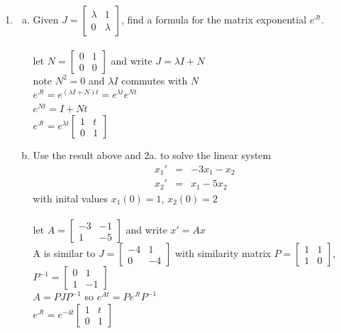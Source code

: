 \documentclass{article}
\begin{document}
{{\begin{enumerate}
\newpage\item \begin{enumerate}[a.]
\item Given $J=\left[\begin{array}{cc}
\lambda & 1\\
0 & \lambda
\end{array}\right]$, find a formula for the matrix exponential $\displaystyle{e^{Jt}}$.
\\
\\let $N=\left[\begin{array}{cc} 0 & 1 \\ 0 & 0 \end{array}\right]$ and write $J=\lambda I + N$
\\note $N^2=0$ and $\lambda I$ commutes with $N$
\\$e^{Jt}=e^{(\lambda I+N)t}=e^{\lambda  t}e^{Nt}$
\\$e^{Nt}=I+Nt$
\\$e^{Jt}=e^{\lambda t}\left[\begin{array}{cc} 1 & t \\ 0 & 1 \end{array}\right]$
\\
\item Use the result above and 2a. to solve the linear system 
$$\begin{array}{rcl}
x_1' &=& -3x_1-x_2 \\
x_2' &=& x_1-5x_2
\end{array}$$
with inital values $x_1(0)=1$, $x_2(0)=2$
\\
\\let $A=\left[\begin{array}{cc} -3 & -1 \\ 1 & -5 \end{array}\right]$ and write $x'=Ax$
\\A is similar to $J=\left[\begin{array}{cc} -4 & 1 \\ 0 & -4 \end{array}\right]$ with similarity matrix $P=\left[\begin{array}{cc} 1 & 1 \\ 1 & 0 \end{array}\right]$, $P^{-1}=\left[\begin{array}{cc} 0 & 1 \\ 1 & -1 \end{array}\right]$
\\$A=PJP^{-1}$ so $e^{At}=Pe^{Jt}P^{-1}$
\\$e^{Jt}=e^{-4t}\left[\begin{array}{cc} 1 & t \\ 0 & 1 \end{array}\right]$

\end{enumerate}
\end{enumerate}}}
\end{document}

